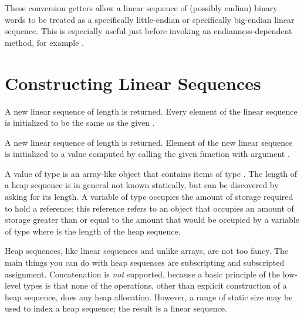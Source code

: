 These conversion getters allow a linear sequence of (possibly endian) binary words
to be treated as a specifically little-endian or specifically big-endian linear sequence.
This is especially useful just before invoking an endianness-dependent method, for example
.


\section{Constructing Linear Sequences}


A new linear sequence of length  is returned.
Every element of the linear sequence is initialized to be the same as the given .



A new linear sequence of length  is returned.
Element  of the new linear sequence is initialized to a value
computed by calling the given function  with argument .



A value of type 
is an array-like object that contains items of type .  The
length of a heap sequence is in general not known statically, but can be discovered
by asking for its length.  A variable of type  occupies the
amount of storage required to hold a reference; this reference refers to an
object that occupies an amount of storage greater than or equal to the amount
that would be occupied by a variable of type 
where  is the length of
the heap sequence.

Heap sequences, like linear sequences and unlike arrays, are not too fancy. The main
things you can do with heap sequences are subscripting and subscripted assignment.
Concatenation is \emph{not} supported, because a basic principle of the low-level types is that
none of the operations, other than explicit construction of a heap sequence,
does any heap allocation.  However, a range of static size may be used to
index a heap sequence; the result is a linear sequence.

